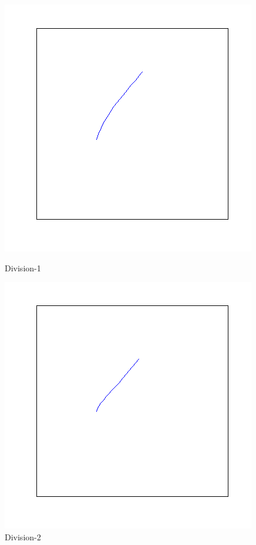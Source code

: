 \documentclass[a4paper, 10pt]{article}
\begin{document}
\begin{figure}[ht]
\begin{minipage}[b]{0.45\linewidth}
\centering
\includegraphics[width=\textwidth]{figs/div-1}
\caption{Division-1}
\label{fig:figure1}
\end{minipage}
\hspace{0.5cm}
\begin{minipage}[b]{0.45\linewidth}
\centering
\includegraphics[width=\textwidth]{figs/div-2}
\caption{Division-2}
\label{fig:figure2}
\end{minipage}
\end{figure}
\end{document}
